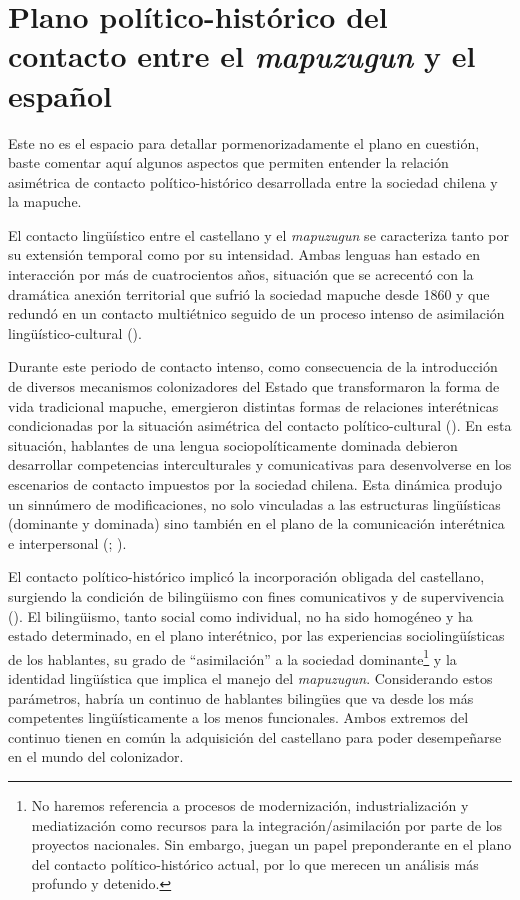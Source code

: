 \documentclass[output=paper]{../langscibook}
\begin{document}
\section{Plano político-histórico del contacto entre el \textit{mapuzugun} y el español}\label{sec:olate:2}


Este no es el espacio para detallar pormenorizadamente el plano en cuestión, baste comentar aquí algunos aspectos que permiten entender la relación asimétrica de contacto político-histórico desarrollada entre la sociedad chilena y la mapuche. 

El contacto lingüístico entre el castellano y el \textit{mapuzugun} se caracteriza tanto por su extensión temporal como por su intensidad. Ambas lenguas han estado en interacción por más de cuatrocientos años, situación que se acrecentó con la dramática anexión territorial que sufrió la sociedad mapuche desde 1860 y que redundó en un contacto multiétnico seguido de un proceso intenso de asimilación lingüístico-cultural (\citealt{PintoRodríguez2000}).

Durante este periodo de contacto intenso, como consecuencia de la introducción de diversos mecanismos colonizadores del Estado que transformaron la forma de vida tradicional mapuche, emergieron distintas formas de relaciones interétnicas condicionadas por la situación asimétrica del contacto político-cultural (\citealt{OlateVinet2017a,OlateVinet2017b}). En esta situación, hablantes de una lengua sociopolíticamente dominada debieron desarrollar competencias interculturales y comunicativas para desenvolverse en los escenarios de contacto impuestos por la sociedad chilena. Esta dinámica produjo un sinnúmero de modificaciones, no solo vinculadas a las estructuras lingüísticas (dominante y dominada) sino también en el plano de la comunicación interétnica e interpersonal (\citealt{Johanson2002}; \citealt{OlateVinet2017a}).

El contacto político-histórico implicó la incorporación obligada del castellano, surgiendo la condición de bilingüismo con fines comunicativos y de supervivencia (\citealt{Bengoa2000,Bengoa2007,Bengoa2014}). El bilingüismo, tanto social como individual, no ha sido homogéneo y ha estado determinado, en el plano interétnico, por las experiencias sociolingüísticas de los hablantes, su grado de “asimilación” a la sociedad dominante\footnote{No haremos referencia a procesos de modernización, industrialización y mediatización como recursos para la integración/asimilación por parte de los proyectos nacionales. Sin embargo, juegan un papel preponderante en el plano del contacto político-histórico actual, por lo que merecen un análisis más profundo y detenido.} y la identidad lingüística que implica el manejo del \textit{mapuzugun}. Considerando estos parámetros, habría un continuo de hablantes bilingües que va desde los más competentes lingüísticamente a los menos funcionales. Ambos extremos del continuo tienen en común la adquisición del castellano para poder desempeñarse en el mundo del colonizador.
\end{document}
